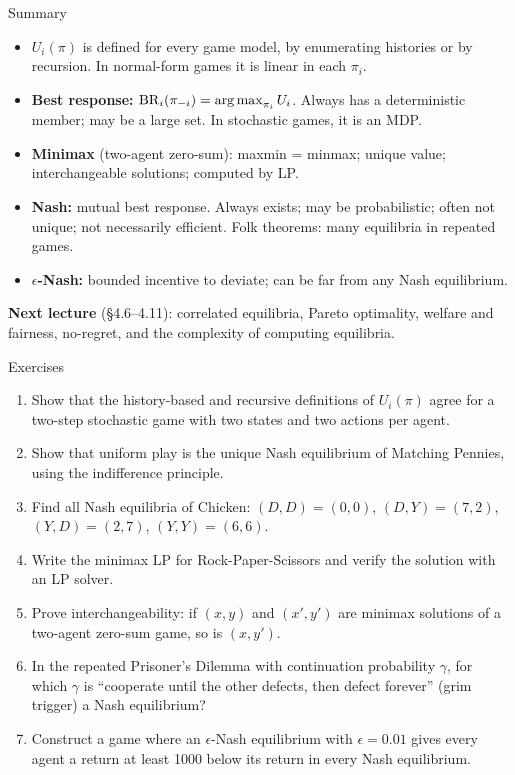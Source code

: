 \documentclass[aspectratio=169,11pt]{beamer}
\begin{document}
\begin{frame}{Summary}
  \begin{itemize}
    \item $U_i(\pi)$ is defined for every game model, by enumerating histories or by recursion. In normal-form games it is linear in each $\pi_i$.
    \item \textbf{Best response:} $\operatorname{BR}_i(\pi_{-i}) = \operatorname*{arg\,max}_{\pi_i} U_i$. Always has a deterministic member; may be a large set. In stochastic games, it is an MDP.
    \item \textbf{Minimax} (two-agent zero-sum): maxmin = minmax; unique value; interchangeable solutions; computed by LP.
    \item \textbf{Nash:} mutual best response. Always exists; may be probabilistic; often not unique; not necessarily efficient. Folk theorems: many equilibria in repeated games.
    \item \textbf{$\epsilon$-Nash:} bounded incentive to deviate; can be far from any Nash equilibrium.
  \end{itemize}
  \bigskip
  \textbf{Next lecture} (\S4.6--4.11): correlated equilibria, Pareto optimality, welfare and fairness, no-regret, and the complexity of computing equilibria.
\end{frame}

\begin{frame}{Exercises}
  \begin{enumerate}
    \item Show that the history-based and recursive definitions of $U_i(\pi)$ agree for a two-step stochastic game with two states and two actions per agent.
    \item Show that uniform play is the unique Nash equilibrium of Matching Pennies, using the indifference principle.
    \item Find all Nash equilibria of Chicken: $(D,D) = (0,0)$, $(D,Y) = (7,2)$, $(Y,D) = (2,7)$, $(Y,Y) = (6,6)$.
    \item Write the minimax LP for Rock-Paper-Scissors and verify the solution with an LP solver.
    \item Prove interchangeability: if $(x, y)$ and $(x', y')$ are minimax solutions of a two-agent zero-sum game, so is $(x, y')$.
    \item In the repeated Prisoner's Dilemma with continuation probability $\gamma$, for which $\gamma$ is ``cooperate until the other defects, then defect forever'' (grim trigger) a Nash equilibrium?
    \item Construct a game where an $\epsilon$-Nash equilibrium with $\epsilon = 0.01$ gives every agent a return at least 1000 below its return in every Nash equilibrium.
  \end{enumerate}
\end{frame}
\end{document}

